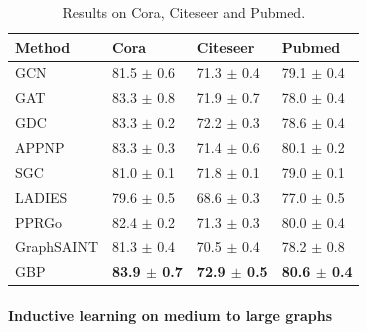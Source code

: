 \documentclass[UTF8]{article} %
\begin{document}
\begin{table}[ht]
\begin{center}
\caption{Results on Cora, Citeseer and Pubmed.}
\label{transductive-table}
\begin{tabular}{llll}
\toprule
Method & Cora & Citeseer & Pubmed \\
\midrule
GCN & 81.5 $\pm$ 0.6 & 71.3 $\pm$ 0.4 & 79.1 $\pm$ 0.4 \\
GAT & 83.3 $\pm$ 0.8& 71.9 $\pm$ 0.7 & 78.0 $\pm$ 0.4\\
GDC & 83.3 $\pm$ 0.2 & 72.2 $\pm$ 0.3 & 78.6 $\pm$ 0.4 \\
APPNP & 83.3 $\pm$ 0.3 & 71.4 $\pm$ 0.6 & 80.1 $\pm$ 0.2 \\
SGC    & 81.0 $\pm$ 0.1 & 71.8 $\pm$ 0.1 & 79.0 $\pm$ 0.1 \\
LADIES& 79.6 $\pm$ 0.5 & 68.6 $\pm$ 0.3 & 77.0 $\pm$ 0.5 \\
PPRGo & 82.4 $\pm$ 0.2 & 71.3 $\pm$ 0.3 & 80.0 $\pm$ 0.4 \\
GraphSAINT& 81.3 $\pm$ 0.4 & 70.5 $\pm$ 0.4 & 78.2 $\pm$ 0.8 \\
\midrule
GBP  & \textbf{83.9 $\pm$ 0.7} & \textbf{72.9 $\pm$ 0.5} & \textbf{80.6 $\pm$ 0.4} \\
\bottomrule
\end{tabular}
\end{center}
\vspace{-0.35cm}
\end{table}

\paragraph{Inductive learning on medium to large graphs}
~\\
~\\
~\\
\end{document}
